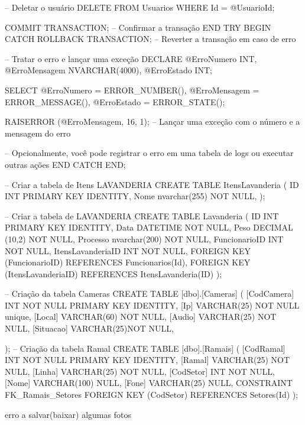         -- Deletar o usuário
        DELETE FROM Usuarios WHERE Id = @UsuarioId;
        
        COMMIT TRANSACTION; -- Confirmar a transação
    END TRY
    BEGIN CATCH
        ROLLBACK TRANSACTION; -- Reverter a transação em caso de erro
        
        -- Tratar o erro e lançar uma exceção
        DECLARE @ErroNumero INT, @ErroMensagem NVARCHAR(4000), @ErroEstado INT;
        
        SELECT 
            @ErroNumero = ERROR_NUMBER(),
            @ErroMensagem = ERROR_MESSAGE(),
            @ErroEstado = ERROR_STATE();
        
        RAISERROR (@ErroMensagem, 16, 1); -- Lançar uma exceção com o número e a mensagem do erro
        
        -- Opcionalmente, você pode registrar o erro em uma tabela de logs ou executar outras ações
    END CATCH
END;

-- Criar a tabela de Itens LAVANDERIA
CREATE TABLE ItensLavanderia (
    ID INT PRIMARY KEY IDENTITY,
	Nome nvarchar(255) NOT NULL,
);

-- Criar a tabela de LAVANDERIA
CREATE TABLE Lavanderia (
    ID INT PRIMARY KEY IDENTITY,
    Data DATETIME NOT NULL,
    Peso DECIMAL (10,2) NOT NULL,
	Processo nvarchar(200) NOT NULL,
    FuncionarioID INT NOT NULL,
	ItensLavanderiaID INT NOT NULL,
    FOREIGN KEY (FuncionarioID) REFERENCES Funcionarios(Id),
	FOREIGN KEY (ItensLavanderiaID) REFERENCES ItensLavanderia(ID)
);

-- Criação da tabela Cameras
CREATE TABLE [dbo].[Cameras]
(
	[CodCamera] INT NOT NULL PRIMARY KEY IDENTITY, 
    [Ip] VARCHAR(25) NOT NULL unique,
	[Local] VARCHAR(60) NOT NULL, 
	[Audio] VARCHAR(25) NOT NULL, 
	[Situacao] VARCHAR(25)NOT NULL,
	
);
-- Criação da tabela Ramal
CREATE TABLE [dbo].[Ramais]
(
    [CodRamal] INT NOT NULL PRIMARY KEY IDENTITY, 
    [Ramal] VARCHAR(25) NOT NULL,
    [Linha] VARCHAR(25) NOT NULL, 
    [CodSetor] INT NOT NULL, 
    [Nome] VARCHAR(100) NULL,
    [Fone] VARCHAR(25) NULL,
    CONSTRAINT FK_Ramais_Setores FOREIGN KEY (CodSetor) REFERENCES Setores(Id)
);

erro a salvar(baixar) algumas fotos

